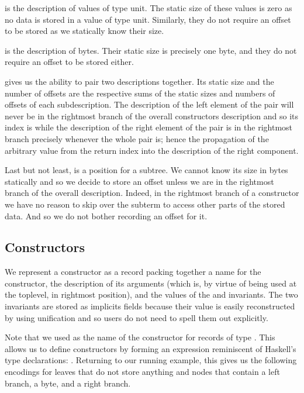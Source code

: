  is the description of values of type unit. The static
size of these values is zero as no data is stored in a value of type unit.
Similarly, they do not require an offset to be stored as we statically
know their size.

 is the description of bytes.
%
Their static size is precisely one byte, and they do not require an
offset to be stored either.

 gives us the ability to pair two descriptions together.
Its static size and the number of offsets are the respective sums of the
static sizes and numbers of offsets of each subdescription.
%
The description of the left element of the pair will never be in the
rightmost branch of the overall constructors description and so its
index is  while the description of the right element
of the pair is in the rightmost branch precisely whenever the whole pair
is; hence the propagation of the  arbitrary value from the
return index into the description of the right component.

Last but not least,  is a position for a subtree.
We cannot know its size in bytes statically and so we decide to store
an offset unless we are in the rightmost branch of the overall description.
%
Indeed, in the rightmost branch of a constructor we have no reason to
skip over the subterm to access other parts of the stored data. And so we
do not bother recording an offset for it.


\subsection{Constructors}

We represent a constructor as a record packing together
a name for the constructor,
the description of its arguments (which is, by virtue of
being used at the toplevel, in rightmost position),
and the values of the  and
 invariants.
%
The two invariants are stored as implicits fields
because their value is easily reconstructed by \idris{}
using unification and so users do not need
to spell them out explicitly.


Note that we used \IdrisData{(::)} as the name of the
constructor for records of type .
This allows us to define constructors by forming an
expression reminiscent of Haskell's type declarations:
 \IdrisData{::} .
%
Returning to our running example, this gives us the following encodings for
leaves that do not store anything
and nodes that contain a left branch, a byte, and a right branch.

